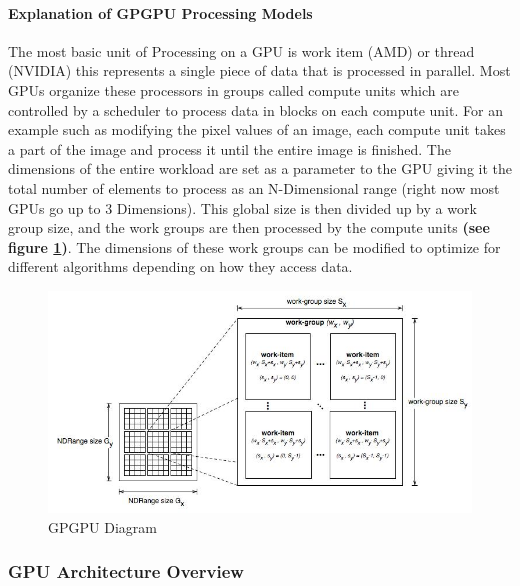 \documentclass[a4paper,10pt]{article}
\begin{document}
\paragraph{Explanation of GPGPU Processing Models}
The most basic unit of Processing on a GPU is work item (AMD) or thread (NVIDIA) this represents a single piece of data that is processed in parallel. Most GPUs organize these processors in groups called 
compute units which are controlled by a scheduler to process data in blocks on each compute unit. For an example such as modifying the pixel values of an image, each compute unit takes a part of the image 
and process it until the entire image is finished. The dimensions of the entire workload are set as a parameter to the GPU giving it the total number of elements to process as an N-Dimensional range (right 
now most GPUs go up to 3 Dimensions). This global size is then divided up by a work group size, and the work groups are then processed by the compute units \textbf{ (see figure \ref{fig:gpu})}. The dimensions of these work groups 
can be modified to optimize for different algorithms depending on how they access data. 
	\begin{figure}[H]
	\includegraphics[width=\linewidth,height=\paperheight,keepaspectratio]{gpgpu.jpg}
	\caption{GPGPU Diagram}
	\label{fig:gpu}
	\end{figure}
\pagebreak

\subsubsection{GPU Architecture Overview}
\end{document}

